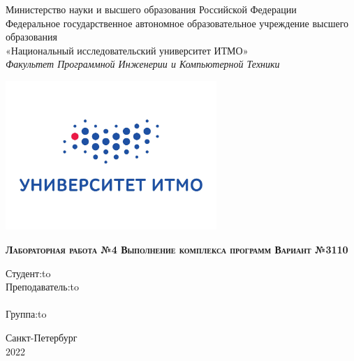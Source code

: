 \Large
\thispagestyle{empty}
\begin{center}
Министерство науки и высшего образования Российской Федерации \\
Федеральное государственное автономное образовательное учреждение высшего образования \\
«Национальный исследовательский университет ИТМО» \\
\vspace{1em}
\textsl{Факультет Программной Инженерии и Компьютерной Техники}\\
\end{center}

\vspace{1em}

\thispagestyle{empty}
\begin{center}
\includegraphics[width=8cm]{img/itmo.jpg}
\end{center}

\vspace{3em}

\begin{center}
\large{
\textsc{\textbf{
Лабораторная работа №4  \linebreak 
Выполнение комплекса программ \linebreak 
Вариант №3110 \linebreak
}}
}
\end{center}

\vspace{10em}



\newbox{\lbox}
\savebox{\lbox}{\hbox{\studName\hfill}}
\newlength{\maxl}
\setlength{\maxl}{\wd\lbox}
\hfill\parbox{10cm}{
\hspace*{5cm}\hspace*{-5cm}Студент:\hfill\hbox to\maxl{\studName\hfill}\\
\hspace*{5cm}\hspace*{-5cm}Преподаватель:\hfill\hbox to\maxl{\teacherName}\\
\\
\hspace*{5cm}\hspace*{-5cm}Группа:\hfill\hbox to\maxl{\groupNumber}\\
}

\vspace{\fill}

\begin{center}
Санкт-Петербург \\2022
\end{center}
\newpage
